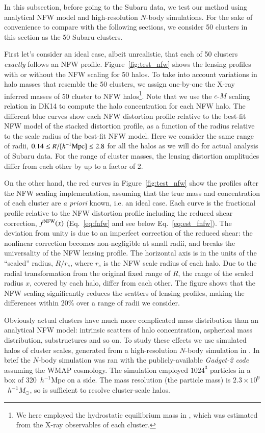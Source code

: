 \documentclass[iop, apj]{emulateapj}
\newcommand{\?}{\stackrel{?}{=}}
\begin{document}
In this subsection, before going to the Subaru data, we test our method
using analytical NFW model and high-resolution $N$-body simulations.
For the sake of convenience to compare with the following sections, we
consider 50 clusters in this section as the 50 Subaru clusters.

First let's consider an ideal case, albeit unrealistic, that each of 50
clusters {\it exactly} follows an NFW profile. Figure~\ref{fig:test_nfw}
shows the lensing profiles with or without the NFW scaling for 50 halos.
To take into account variations in halo masses that resemble the 50
clusters, we assign one-by-one the X-ray inferred masses of 50 cluster
to NFW halos\footnote{We here employed the hydrostatic equilibrium mass
in \citet{Martinoetal:14}, which was estimated from the X-ray
observables of each cluster.}.  Note that we use the $c$-$M$ scaling
relation in DK14 to compute the halo concentration for each NFW halo.
The different blue curves show each NFW distortion profile relative to
the best-fit NFW model of the stacked distortion profile, as a function
of the radius relative to the scale radius of the best-fit NFW
model. Here we consider the same range of radii, $0.14\le R/[h^{-1}{\rm
Mpc}]\le 2.8$ for all the halos as we will do for actual analysis of
Subaru data. For the range of cluster masses, the lensing distortion
amplitudes differ from each other by up to a factor of 2.

On the other hand, the red curves in Figure~\ref{fig:test_nfw} show the
profiles after the NFW scaling implementation, assuming that the true
mass and concentration of each cluster are {\it a priori} known, i.e. an
ideal case. Each curve is the fractional profile relative to the NFW
distortion profile including the reduced shear correction, $f^{\rm
NFW}(x)$ (Eq.~\ref{eq:fnfw} and see below Eq.~\ref{eq:est_fnfw}). The
deviation from unity is due to an imperfect correction of the reduced
shear: the nonlinear correction becomes non-negligible at small radii,
and breaks the universality of the NFW lensing profile. The horizontal
axis is in the units of the ``scaled'' radius, $R/r_s$, where $r_s$ is
the NFW scale radius of each halo. Due to the radial transformation from
the original fixed range of $R$, the range of the scaled radius $x$,
covered by each halo, differ from each other. The figure shows that the
NFW scaling significantly reduces the scatters of lensing profiles,
making the differences within 20\% over a range of radii we consider.

Obviously actual clusters have much more complicated mass distribution
than an analytical NFW model: intrinsic scatters of halo concentration,
aspherical mass distribution, substructures and so on. To study these
effects we use simulated halos of cluster scales, generated from a
high-resolution $N$-body simulation in \citet{Takahashietal:12}.  In
brief the $N$-body simulation was ran with the publicly-available {\it
Gadget-2 code} \citep{Springeletal:01,Springel:05} assuming the WMAP
cosmology.  The simulation employed $1024^3$ particles in a box of
320~$h^{-1}$Mpc on a side. The mass resolution (the particle mass) is
$2.3\times 10^9$~$h^{-1}M_\odot$, so is sufficient to resolve
cluster-scale halos. 
\end{document}
